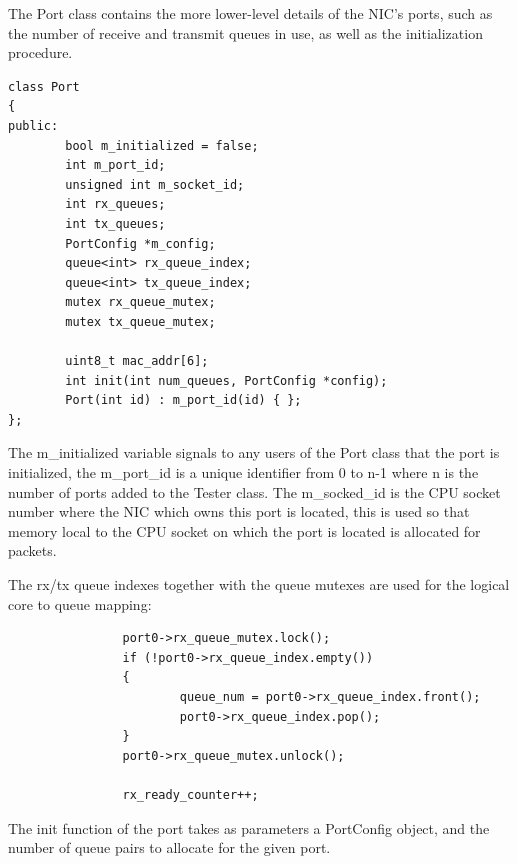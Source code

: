 \documentclass[a4paper,12p,titlepage]{article}
\begin{document}
The Port class contains the more lower-level details of the NIC’s ports, such as the number of receive and transmit queues in use, as well as the initialization procedure.

\begin{frame}

\lstset{language=C++,breaklines=true,numbers=left}
\begin{lstlisting}
class Port
{
public:
        bool m_initialized = false;
        int m_port_id;
        unsigned int m_socket_id;
        int rx_queues;
        int tx_queues;
        PortConfig *m_config;
        queue<int> rx_queue_index;
        queue<int> tx_queue_index;
        mutex rx_queue_mutex;
        mutex tx_queue_mutex;

        uint8_t mac_addr[6];
        int init(int num_queues, PortConfig *config);
        Port(int id) : m_port_id(id) { };
};
\end{lstlisting}
\end{frame}

The m\_initialized variable signals to any users of the Port class that the port is initialized, the m\_port\_id is a unique identifier from 0 to n-1 where n is the number of ports added to the Tester class. The m\_socked\_id is the CPU socket number where the NIC which owns this port is located, this is used so that memory local to the CPU socket on which the port is located is allocated for packets.

The rx/tx queue indexes together with the queue mutexes are used for the logical core to queue mapping:

\begin{frame}

\lstset{language=C++,breaklines=true,numbers=left}
\begin{lstlisting}
                port0->rx_queue_mutex.lock();
                if (!port0->rx_queue_index.empty())
                {
                        queue_num = port0->rx_queue_index.front();
                        port0->rx_queue_index.pop();
                }
                port0->rx_queue_mutex.unlock();

                rx_ready_counter++;
\end{lstlisting}
\end{frame}

The init function of the port takes as parameters a PortConfig object, and the number of queue pairs to allocate for the given port.
\end{document}
